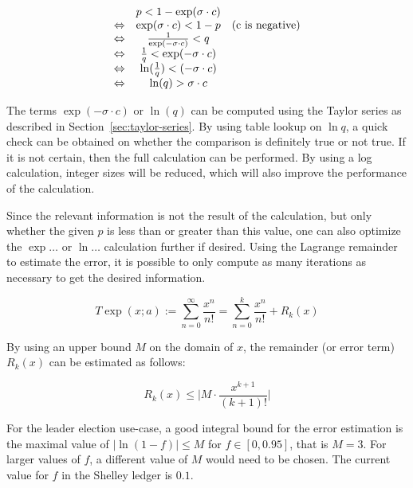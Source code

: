 \documentclass[11pt,a4paper,dvipsnames,twosided]{article}
\newcommand{\khcomment}[1]{\todo[color=blue!20]{KH: #1}}
\theoremstyle{definition}
\theoremstyle{definition}
\begin{document}
\begin{equation*}
  \begin{array}[h]{ccc}
    & p < 1 - \exp(\sigma \cdot c) & \\
    \Leftrightarrow & \exp(\sigma \cdot c) < 1 - p & (\textrm{c is negative})\\
    \Leftrightarrow & \frac{1}{\exp(-\sigma \cdot c)} < q & \\
    \Leftrightarrow & \frac{1}{q} < \exp(-\sigma \cdot c) & \\
    \Leftrightarrow & \ln(\frac{1}{q}) < (-\sigma \cdot c) & \\
    \Leftrightarrow & \ln(q) > \sigma \cdot c &
  \end{array}
\end{equation*}

\noindent
The terms $\exp(-\sigma \cdot c)$ or $\ln(q)$ can be computed using the Taylor series as
described in Section~\ref{sec:taylor-series}.   By using table lookup on $\ln{q}$, a quick
check can be obtained on whether the comparison is definitely true or not true.  If it is
not certain, then the full calculation can be performed. By using a log calculation, integer sizes will
be reduced, which will also improve the performance of the calculation.

Since the relevant information is not the result of the calculation, but only whether
the given $p$ is less than or greater than this value, one can also optimize the $\exp{\ldots}$ or $\ln{\ldots}$
calculation further if desired. Using the Lagrange remainder to estimate the error, it is possible to
only compute as many iterations as necessary to get the desired information.

\begin{equation*}
    T \exp(x; a) := \sum_{n=0}^{\infty}\frac{x^{n}}{n!} =
    \sum_{n=0}^k\frac{x^{n}}{n!} + R_{k}(x)
\end{equation*}

By using an upper bound $M$ on the domain of $x$, the remainder (or error
term) $R_{k}(x)$ can be estimated as follows:

\begin{equation*}
  R_{k}(x) \leq \vert M \cdot \frac{x^{k+1}}{(k+1)!}\vert
\end{equation*}

For the leader election use-case, a good integral bound for the error
estimation is the maximal value of $\vert\ln(1 - f)\vert\leq M$ for
$f \in [0, 0.95]$, that is $M = 3$\khcomment{check!}.
For larger values of $f$, a different value of $M$
would need to be chosen. The current value for $f$ in the Shelley ledger is $0.1$.
\end{document}
